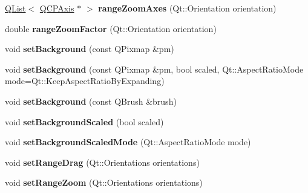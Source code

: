 \begin{DoxyCompactItemize}
\item 
\hyperlink{class_q_list}{Q\+List}$<$ \hyperlink{class_q_c_p_axis}{Q\+C\+P\+Axis} $\ast$ $>$ {\bfseries range\+Zoom\+Axes} (Qt\+::\+Orientation orientation)\hypertarget{class_q_c_p_axis_rect_afe65f86ff947928515d0c07280405bde}{}\label{class_q_c_p_axis_rect_afe65f86ff947928515d0c07280405bde}

\item 
double {\bfseries range\+Zoom\+Factor} (Qt\+::\+Orientation orientation)\hypertarget{class_q_c_p_axis_rect_ae4e6c4d143aacc88d2d3c56f117c2fe1}{}\label{class_q_c_p_axis_rect_ae4e6c4d143aacc88d2d3c56f117c2fe1}

\item 
void {\bfseries set\+Background} (const Q\+Pixmap \&pm)\hypertarget{class_q_c_p_axis_rect_af615ab5e52b8e0a9a0eff415b6559db5}{}\label{class_q_c_p_axis_rect_af615ab5e52b8e0a9a0eff415b6559db5}

\item 
void {\bfseries set\+Background} (const Q\+Pixmap \&pm, bool scaled, Qt\+::\+Aspect\+Ratio\+Mode mode=Qt\+::\+Keep\+Aspect\+Ratio\+By\+Expanding)\hypertarget{class_q_c_p_axis_rect_ac48a2d5d9b7732e73b86605c69c5e4c1}{}\label{class_q_c_p_axis_rect_ac48a2d5d9b7732e73b86605c69c5e4c1}

\item 
void {\bfseries set\+Background} (const Q\+Brush \&brush)\hypertarget{class_q_c_p_axis_rect_a22a22b8668735438dc06f9a55fe46b33}{}\label{class_q_c_p_axis_rect_a22a22b8668735438dc06f9a55fe46b33}

\item 
void {\bfseries set\+Background\+Scaled} (bool scaled)\hypertarget{class_q_c_p_axis_rect_ae6d36c3e0e968ffb991170a018e7b503}{}\label{class_q_c_p_axis_rect_ae6d36c3e0e968ffb991170a018e7b503}

\item 
void {\bfseries set\+Background\+Scaled\+Mode} (Qt\+::\+Aspect\+Ratio\+Mode mode)\hypertarget{class_q_c_p_axis_rect_a5ef77ea829c9de7ba248e473f48f7305}{}\label{class_q_c_p_axis_rect_a5ef77ea829c9de7ba248e473f48f7305}

\item 
void {\bfseries set\+Range\+Drag} (Qt\+::\+Orientations orientations)\hypertarget{class_q_c_p_axis_rect_ae6aef2f7211ba6097c925dcd26008418}{}\label{class_q_c_p_axis_rect_ae6aef2f7211ba6097c925dcd26008418}

\item 
void {\bfseries set\+Range\+Zoom} (Qt\+::\+Orientations orientations)\hypertarget{class_q_c_p_axis_rect_a7960a9d222f1c31d558b064b60f86a31}{}\label{class_q_c_p_axis_rect_a7960a9d222f1c31d558b064b60f86a31}


\end{DoxyCompactItemize}
